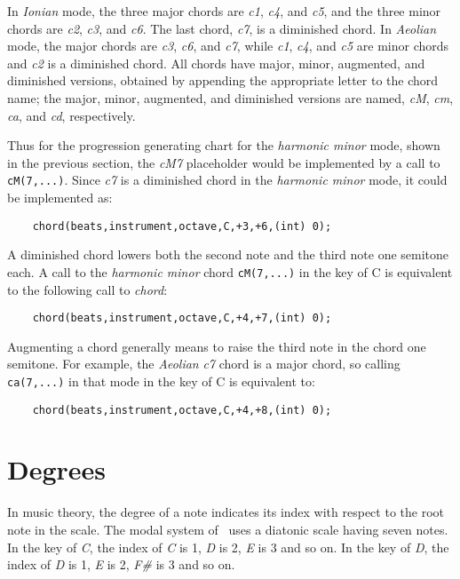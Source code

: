 \documentclass{article}
\begin{document}
In {\it Ionian} mode,
the three major chords are {\it c1}, {\it c4}, and {\it c5},
and the three minor chords are {\it c2}, {\it c3}, and {\it c6}.
The last chord, {\it c7}, is
a diminished chord.
In {\it Aeolian} mode, the major chords are {\it c3}, {\it c6}, and {\it c7},
while {\it c1}, {\it c4}, and
{\it c5} are minor chords and {\it c2} is a diminished chord.
All chords have major, minor, augmented, and
diminished versions, obtained by appending the appropriate
letter to the chord name; the major, minor, augmented,
and diminished versions are named, {\it cM}, {\it cm}, {\it ca}, and {\it cd},
respectively.

Thus for the progression generating chart for the {\it harmonic minor} mode,
shown in
the previous section, the {\it cM7} placeholder would be implemented by
a call to \verb!cM(7,...)!.
Since {\it c7} is a diminished chord in the {\it harmonic minor} mode,
it could be implemented as:

\begin{verbatim}
    chord(beats,instrument,octave,C,+3,+6,(int) 0);
\end{verbatim}

A diminished chord lowers both the
second note and the third note one semitone each.
A call to the {\it harmonic minor} chord \verb!cM(7,...)! in the key of C is 
equivalent to the following call to {\it chord}:

\begin{verbatim}
    chord(beats,instrument,octave,C,+4,+7,(int) 0);
\end{verbatim}

Augmenting a chord generally means to
raise the third note in the chord one semitone. For example,
the {\it Aeolian} {\it c7} chord is a major chord, so
calling \verb!ca(7,...)! in that mode in the key of C is equivalent to:

\begin{verbatim}
    chord(beats,instrument,octave,C,+4,+8,(int) 0);
\end{verbatim}

\section*{Degrees}

In music theory, the degree of a note indicates
its index with respect to the root note in the
scale. The modal system of \songlib\ uses a
diatonic scale having seven notes. In the key
of {\it C}, the index of {\it C} is 1, {\it D} is 2, {\it E} is 3 and
so on. In the key of {\it D}, the index of {\it D} is 1,
{\it E} is 2, {\it F\#} is 3 and so on. 
\end{document}
